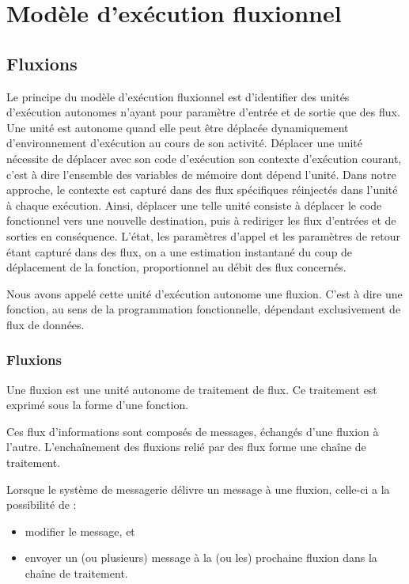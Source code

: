 \section{Modèle d'exécution fluxionnel}

\subsection{Fluxions}

Le principe du modèle d'exécution fluxionnel est d'identifier des unités d'exécution autonomes n'ayant pour paramètre d'entrée et de sortie que des flux.
Une unité est autonome quand elle peut être déplacée dynamiquement d'environnement d'exécution au cours de son activité.
Déplacer une unité nécessite de déplacer avec son code d'exécution son contexte d'exécution courant, c'est à dire l'ensemble des variables de mémoire dont dépend l'unité. Dans notre approche, le contexte est capturé dans des flux spécifiques réinjectés dans l'unité à chaque exécution.
Ainsi, déplacer une telle unité consiste à déplacer le code fonctionnel vers une nouvelle destination, puis à rediriger les flux d'entrées et de sorties en conséquence.
L'état, les paramètres d'appel et les paramètres de retour étant capturé dans des flux, on a une estimation instantané du coup de déplacement de la fonction, proportionnel au débit des flux concernés. 

Nous avons appelé cette unité d'exécution autonome une fluxion. C'est à dire une fonction, au sens de la programmation fonctionnelle, dépendant exclusivement de flux de données.

	\subsubsection{Fluxions}

	Une fluxion est une unité autonome de traitement de flux.
	Ce traitement est exprimé sous la forme d'une fonction.

	Ces flux d'informations sont composés de messages, échangés d'une fluxion à l'autre.
	L'enchaînement des fluxions relié par des flux forme une chaîne de traitement.

	Lorsque le système de messagerie délivre un message à une fluxion, celle-ci a la possibilité de :
	\begin{itemize}
		\item modifier le message, et
		\item envoyer un (ou plusieurs) message à la (ou les) prochaine fluxion dans la chaîne de traitement.
	\end{itemize}

